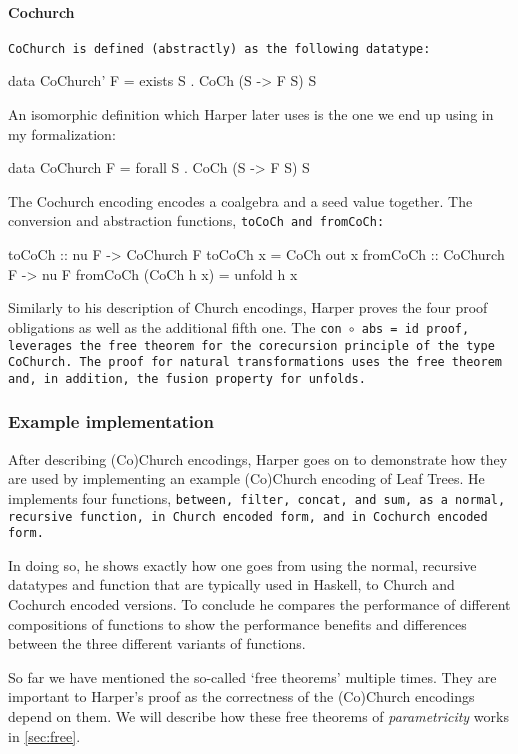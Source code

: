 \paragraph{Cochurch} \tt{CoChurch} is defined (abstractly) as the following datatype:
\begin{code}
data CoChurch' F = exists S . CoCh (S -> F S) S
\end{code}
An isomorphic definition which Harper later uses is the one we end up using in my formalization:
\begin{code}
data CoChurch F = forall S . CoCh (S -> F S) S
\end{code}
The Cochurch encoding encodes a coalgebra and a seed value together.
The conversion and abstraction functions, \tt{toCoCh} and \tt{fromCoCh}:
\begin{code}
toCoCh :: nu F -> CoChurch F
toCoCh x = CoCh out x
fromCoCh :: CoChurch F -> nu F
fromCoCh (CoCh h x) = unfold h x  
\end{code}
Similarly to his description of Church encodings, Harper proves the four proof obligations as well as the additional fifth one.
The \tt{con $\circ$ abs = id} proof, leverages the free theorem for the corecursion principle of the type \tt{CoChurch}.
The proof for natural transformations uses the free theorem and, in addition, the fusion property for unfolds.

\subsubsection{Example implementation}
After describing (Co)Church encodings, Harper goes on to demonstrate how they are used by implementing an example (Co)Church encoding of Leaf Trees.
He implements four functions, \tt{between}, \tt{filter}, \tt{concat}, and \tt{sum}, as a normal, recursive function, in Church encoded form, and in Cochurch encoded form.

In doing so, he shows exactly how one goes from using the normal, recursive datatypes and function that are typically used in Haskell, to Church and Cochurch encoded versions.
To conclude he compares the performance of different compositions of functions to show the performance benefits and differences between the three different variants of functions.

So far we have mentioned the so-called `free theorems' multiple times.
They are important to Harper's proof as the correctness of the (Co)Church encodings depend on them.
We will describe how these free theorems of \textit{parametricity} works in \autoref{sec:free}.

\iffalse
\begin{itemize}
    \Item 
\end{itemize}
\fi
